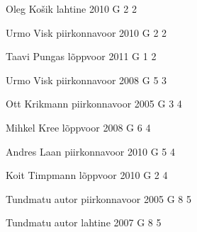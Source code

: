 \documentclass[11pt]{article}
\begin{document}
{Oleg Košik} %
{lahtine} %
{2010} %
{G 2} %
{2} %
{

\ifEngHint
\fi
}

{Urmo Visk} %
{piirkonnavoor} %
{2010} %
{G 2} %
{2} %
{

\ifEngHint
\fi
}

{Taavi Pungas} %
{lõppvoor} %
{2011} %
{G 1} %
{2} %
{

\ifEngHint
\fi
}

{Urmo Visk} %
{piirkonnavoor} %
{2008} %
{G 5} %
{3} %
{

\ifEngHint
\fi
}

{Ott Krikmann} %
{piirkonnavoor} %
{2005} %
{G 3} %
{4} %
{

\ifEngHint
\fi
}

{Mihkel Kree} %
{lõppvoor} %
{2008} %
{G 6} %
{4} %
{

\ifEngHint
\fi
}

{Andres Laan} %
{piirkonnavoor} %
{2010} %
{G 5} %
{4} %
{

\ifEngHint
\fi
}

{Koit Timpmann} %
{lõppvoor} %
{2010} %
{G 2} %
{4} %
{

\ifEngHint
\fi
}

{Tundmatu autor} %
{piirkonnavoor} %
{2005} %
{G 8} %
{5} %
{

\ifEngHint
\fi
}

{Tundmatu autor} %
{lahtine} %
{2007} %
{G 8} %
{5} %
{

\ifEngHint
\fi
}
\end{document}
